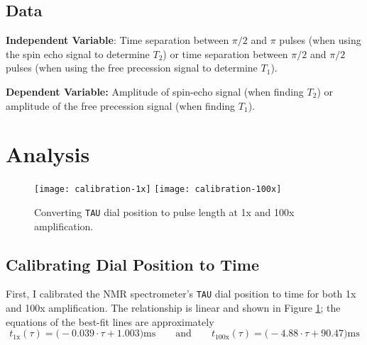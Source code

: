 \documentclass[11pt, a4paper]{article}
\newcommand{\eqtext}[1]{\qquad \text{#1} \qquad}
\begin{document}
\subsection{Data}
\textbf{Independent Variable}: Time separation between $ \pi/2 $ and $ \pi $ pulses (when using the spin echo signal to determine $ T_{2} $) or time separation between $ \pi/2 $ and $ \pi/2 $ pulses (when using the free precession signal to determine $ T_{1} $).

\vspace{2mm}
\textbf{Dependent Variable:} Amplitude of spin-echo signal (when finding $ T_{2} $) or amplitude of the free precession signal (when finding $ T_{1} $).

\section{Analysis}

\begin{figure}
\centering
\texttt{[image: calibration-1x]} \hfill
\texttt{[image: calibration-100x]}
\caption{Converting \texttt{TAU} dial position to pulse length at 1x and 100x amplification.}
\label{nmr:fig:calibration}
\end{figure}

\subsection{Calibrating Dial Position to Time}
First, I calibrated the NMR spectrometer's \texttt{TAU} dial position to time for both 1x and 100x amplification. The relationship is linear and shown in Figure \ref{nmr:fig:calibration}; the equations of the best-fit lines are approximately
\begin{equation*}
	t_{\text{1x}}(\tau) = \big(- 0.039 \cdot \tau + 1.003 \big) \si{\milli \second} \eqtext{and} 	t_{\text{100x}}(\tau) = \big(- 4.88 \cdot \tau + 90.47 \big) \si{\milli \second}
\end{equation*}
\end{document}
